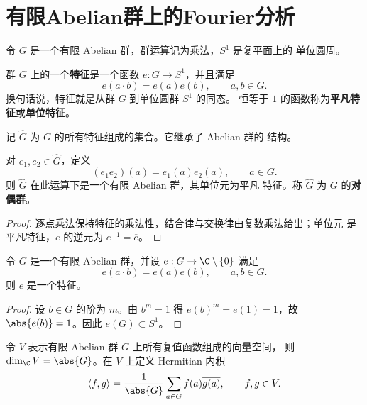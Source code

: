 \section{有限Abelian群上的Fourier分析}

令 $G$ 是一个有限 Abelian 群，群运算记为乘法，$S^1$ 是复平面上的
单位圆周。

\begin{definition}\label{def:finite-group-character}
	群 $G$ 上的一个\textbf{特征}是一个函数 $e:G\to S^1$，并且满足
	\[
	e(a\cdot b)=e(a)e(b),
	\qquad a,b\in G.
	\]
	换句话说，特征就是从群 $G$ 到单位圆群 $S^1$ 的同态。
	恒等于 $1$ 的函数称为\textbf{平凡特征}或\textbf{单位特征}。
\end{definition}

记 $\widehat G$ 为 $G$ 的所有特征组成的集合。它继承了 Abelian 群的
结构。

\begin{lemma}\label{lem:dual-group}
	对 $e_1,e_2\in\widehat G$，定义
	\[
	(e_1e_2)(a)=e_1(a)e_2(a),
	\qquad a\in G.
	\]
	则 $\widehat G$ 在此运算下是一个有限 Abelian 群，其单位元为平凡
	特征。称 $\widehat G$ 为 $G$ 的\textbf{对偶群}。
\end{lemma}

\begin{proof}
	逐点乘法保持特征的乘法性，结合律与交换律由复数乘法给出；单位元
	是平凡特征，$e$ 的逆元为 $e^{-1}=\overline e$。
\end{proof}

\begin{lemma}\label{lem:finite-homomorphism-is-character}
	令 $G$ 是一个有限 Abelian 群，并设
	$e:G\to\C\setminus\{0\}$ 满足
	\[
	e(a\cdot b)=e(a)e(b),
	\qquad a,b\in G.
	\]
	则 $e$ 是一个特征。
\end{lemma}

\begin{proof}
	设 $b\in G$ 的阶为 $m$。由 $b^m=1$ 得
	$e(b)^m=e(1)=1$，故 $\abs{e(b)}=1$。因此 $e(G)\subset S^1$。
\end{proof}

令 $V$ 表示有限 Abelian 群 $G$ 上所有复值函数组成的向量空间，
则 $\dim_\C V=\abs{G}$。在 $V$ 上定义 Hermitian 内积
\begin{equation}\label{eq:finite-group-hermitian-inner-product}
	\langle f,g\rangle
	=\frac1{\abs{G}}\sum_{a\in G}f(a)\overline{g(a)},
	\qquad f,g\in V.
\end{equation}

